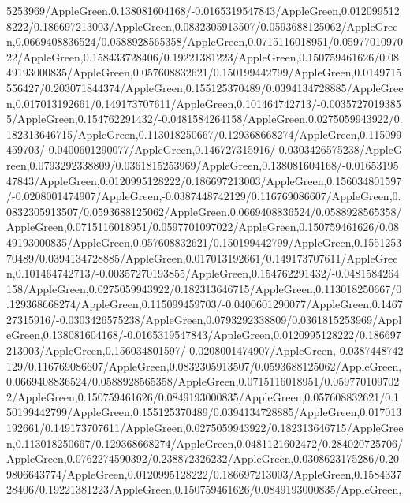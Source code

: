 {\begin{tikzternal}
{5253969/AppleGreen,0.138081604168/-0.0165319547843/AppleGreen,0.0120995128222/0.186697213003/AppleGreen,0.0832305913507/0.0593688125062/AppleGreen,0.0669408836524/0.0588928565358/AppleGreen,0.0715116018951/0.0597701097022/AppleGreen,0.158433728406/0.19221381223/AppleGreen,0.150759461626/0.0849193000835/AppleGreen,0.057608832621/0.150199442799/AppleGreen,0.0149715556427/0.203071844374/AppleGreen,0.155125370489/0.0394134728885/AppleGreen,0.017013192661/0.149173707611/AppleGreen,0.101464742713/-0.00357270193855/AppleGreen,0.154762291432/-0.0481584264158/AppleGreen,0.0275059943922/0.182313646715/AppleGreen,0.113018250667/0.129368668274/AppleGreen,0.115099459703/-0.0400601290077/AppleGreen,0.146727315916/-0.0303426575238/AppleGreen,0.0793292338809/0.0361815253969/AppleGreen,0.138081604168/-0.0165319547843/AppleGreen,0.0120995128222/0.186697213003/AppleGreen,0.156034801597/-0.0208001474907/AppleGreen,-0.0387448742129/0.116769086607/AppleGreen,0.0832305913507/0.0593688125062/AppleGreen,0.0669408836524/0.0588928565358/AppleGreen,0.0715116018951/0.0597701097022/AppleGreen,0.150759461626/0.0849193000835/AppleGreen,0.057608832621/0.150199442799/AppleGreen,0.155125370489/0.0394134728885/AppleGreen,0.017013192661/0.149173707611/AppleGreen,0.101464742713/-0.00357270193855/AppleGreen,0.154762291432/-0.0481584264158/AppleGreen,0.0275059943922/0.182313646715/AppleGreen,0.113018250667/0.129368668274/AppleGreen,0.115099459703/-0.0400601290077/AppleGreen,0.146727315916/-0.0303426575238/AppleGreen,0.0793292338809/0.0361815253969/AppleGreen,0.138081604168/-0.0165319547843/AppleGreen,0.0120995128222/0.186697213003/AppleGreen,0.156034801597/-0.0208001474907/AppleGreen,-0.0387448742129/0.116769086607/AppleGreen,0.0832305913507/0.0593688125062/AppleGreen,0.0669408836524/0.0588928565358/AppleGreen,0.0715116018951/0.0597701097022/AppleGreen,0.150759461626/0.0849193000835/AppleGreen,0.057608832621/0.150199442799/AppleGreen,0.155125370489/0.0394134728885/AppleGreen,0.017013192661/0.149173707611/AppleGreen,0.0275059943922/0.182313646715/AppleGreen,0.113018250667/0.129368668274/AppleGreen,0.0481121602472/0.284020725706/AppleGreen,0.0762274590392/0.238872326232/AppleGreen,0.0308623175286/0.209806643774/AppleGreen,0.0120995128222/0.186697213003/AppleGreen,0.158433728406/0.19221381223/AppleGreen,0.150759461626/0.0849193000835/AppleGreen,
}
\end{tikzternal}}

